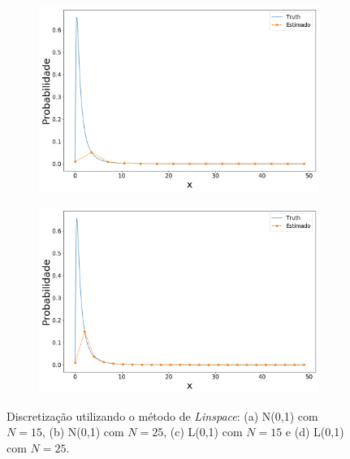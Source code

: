 \begin{figure}[ht]
\begin{subfigure}[b]{0.45\textwidth}
		\caption{}
		\label{fig:lin_norm25}
	\end{subfigure}
	\\
	\begin{subfigure}[b]{0.45\textwidth}
		\centering 
		\includegraphics[width=\linewidth]{./figuras/Linspace_lognormal_15}
		\caption{}
		\label{fig:lin_log15}
	\end{subfigure}
	\hfill
	\begin{subfigure}[b]{0.45\textwidth}
		\centering 
		\includegraphics[width=\linewidth]{./figuras/Linspace_lognormal_25}
		\caption{}
		\label{fig:lin_log25}
	\end{subfigure}
	
	\caption{Discretização utilizando o método de \textit{Linspace}: (a) N(0,1) com $N = 15$, (b) N(0,1) com $N = 25$, (c) L(0,1) com $N = 15$ e (d) L(0,1) com $N = 25$.}
	\label{fig:normlin}
\end{figure}


